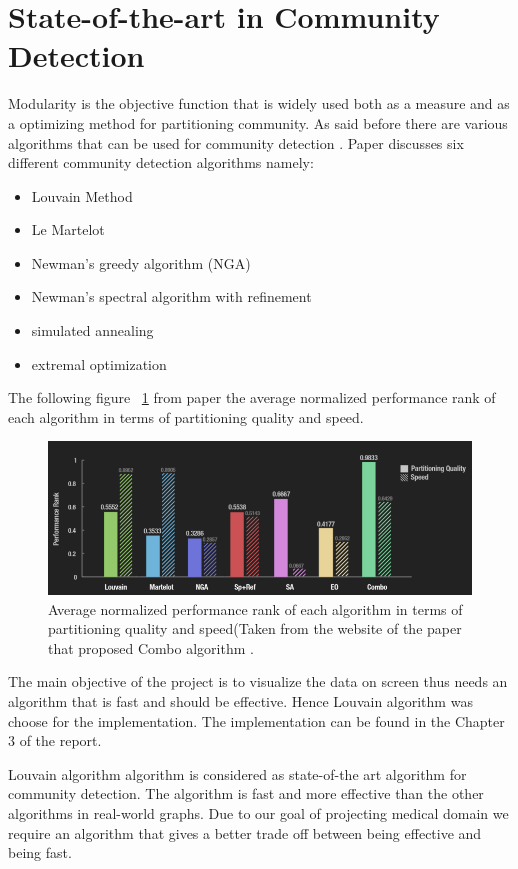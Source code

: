 \section{State-of-the-art in Community Detection}
Modularity is the objective function that is widely used both as a measure and as a optimizing method for partitioning community.
As said before there are various algorithms that can be used for community detection . Paper \cite{generalcommunity} discusses six different community detection algorithms namely: 
\begin{itemize}
\item Louvain Method
\item Le Martelot
\item Newman’s greedy algorithm (NGA)
\item Newman’s spectral algorithm with refinement
\item simulated annealing
\item extremal optimization
\end{itemize}
The following figure ~\ref{Fig1} from paper \cite{generalcommunity} the average normalized performance rank of each algorithm in terms of partitioning quality and speed.  
\begin{figure}[h]
\centering
\includegraphics[scale=0.5]{lou.png}
\caption{\label{Fig1}Average normalized performance rank of each algorithm in terms of partitioning quality and speed(Taken from the website of the paper that proposed Combo algorithm \cite{generalcommunity}.}

\end{figure}
The main objective of the project is to visualize the data on screen thus needs an algorithm that is fast and should be effective.  Hence Louvain algorithm was choose for the implementation. The implementation can be found in the Chapter 3 of the report.


Louvain algorithm algorithm is considered as state-of-the art algorithm for community detection\cite{Louvain}. The algorithm is fast and more effective than the other algorithms in real-world graphs. Due to our goal of projecting medical domain we require an algorithm that gives a better trade off between being effective and being fast. 

